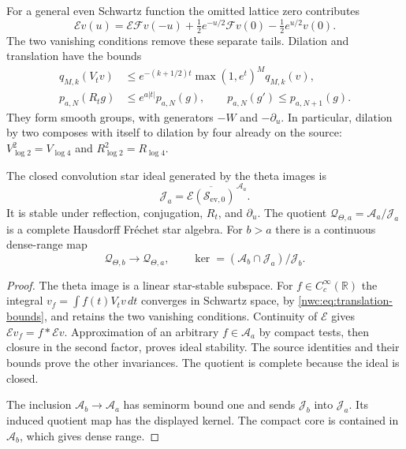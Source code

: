 For a general even Schwartz function the omitted lattice zero contributes
\[
 \mathcal Ev(u)=\mathcal E\mathcal Fv(-u)
     +\tfrac12e^{-u/2}\mathcal Fv(0)-\tfrac12e^{u/2}v(0).
\]
The two vanishing conditions remove these separate tails.
Dilation and translation have the bounds
\begin{equation}\label{nwc:eq:translation-bounds}
 \begin{split}
 q_{M,k}(V_tv)&\leq e^{-(k+1/2)t}\max(1,e^t)^M q_{M,k}(v),\\
 p_{a,N}(R_tg)&\leq e^{a|t|}p_{a,N}(g),\qquad
 p_{a,N}(g')\leq p_{a,N+1}(g).
 \end{split}
\end{equation}
They form smooth groups, with generators $-W$ and $-\partial_u$.
In particular, dilation by two composes with itself to dilation by four
already on the source:
$V_{\log2}^2=V_{\log4}$ and $R_{\log2}^2=R_{\log4}$.

\begin{proposition}\label{nwc:prop:ideal}
The closed convolution star ideal generated by the theta images is
\[
 \mathcal J_a=\overline{\mathcal E(\mathcal S_{\mathrm{ev},0})}^{\,\mathcal A_a}.
\]
It is stable under reflection, conjugation, $R_t$, and $\partial_u$.
The quotient $\mathcal Q_{\Theta,a}=\mathcal A_a/\mathcal J_a$ is a
complete Hausdorff Fr\'echet star algebra.
For $b>a$ there is a continuous dense-range map
\begin{equation}\label{nwc:eq:step-map}
 \mathcal Q_{\Theta,b}\longrightarrow\mathcal Q_{\Theta,a},
 \qquad
 \ker= (\mathcal A_b\cap\mathcal J_a)/\mathcal J_b.
\end{equation}
\end{proposition}
\begin{proof}
The theta image is a linear star-stable subspace.
For $f\in C_c^\infty(\mathbb R)$ the integral
$v_f=\int f(t)V_tv\,dt$ converges in Schwartz space, by
\eqref{nwc:eq:translation-bounds}, and retains the two vanishing
conditions. Continuity of $\mathcal E$ gives
$\mathcal Ev_f=f*\mathcal Ev$.
Approximation of an arbitrary $f\in\mathcal A_a$ by compact tests,
then closure in the second factor, proves ideal stability.
The source identities and their bounds prove the other invariances.
The quotient is complete because the ideal is closed.

The inclusion $\mathcal A_b\to\mathcal A_a$ has seminorm bound one
and sends $\mathcal J_b$ into $\mathcal J_a$.
Its induced quotient map has the displayed kernel.
The compact core is contained in $\mathcal A_b$, which gives dense range.
\end{proof}

